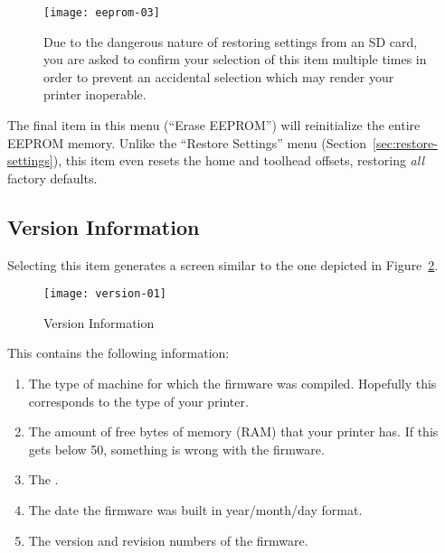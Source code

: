 \begin{figure}[!htbp]
  \centering
    \texttt{[image: eeprom-03]}
    \caption{Due to the dangerous nature of restoring settings from an SD card, you are asked to confirm your selection of this item multiple times in order to prevent an accidental selection which may render your printer inoperable.}
  \label{fig:three}
\end{figure}

The final item in this menu (``Erase EEPROM'') will reinitialize the entire EEPROM memory.  Unlike the ``Restore Settings'' menu (Section~\ref{sec:restore-settings}), this item even resets the home and toolhead offsets, restoring \emph{all} factory defaults.


\subsection{Version Information} \label{sec:versinf}

Selecting this item generates a screen similar to the one depicted in Figure~\ref{fig:vi}. 

\begin{figure}[!htbp]
  \centering
    \texttt{[image: version-01]}
    \caption{Version Information}
  \label{fig:vi}
\end{figure}

This contains the following information:

\begin{enumerate}
\item The type of machine for which the firmware was compiled.  Hopefully this corresponds to the type of your printer.
\item The amount of free bytes of memory (RAM) that your printer has.  If this gets below 50, something is wrong with the firmware.
\item The .
\item The date the firmware was built in year/month/day format.
\item The version and revision numbers of the firmware.
\end{enumerate}
